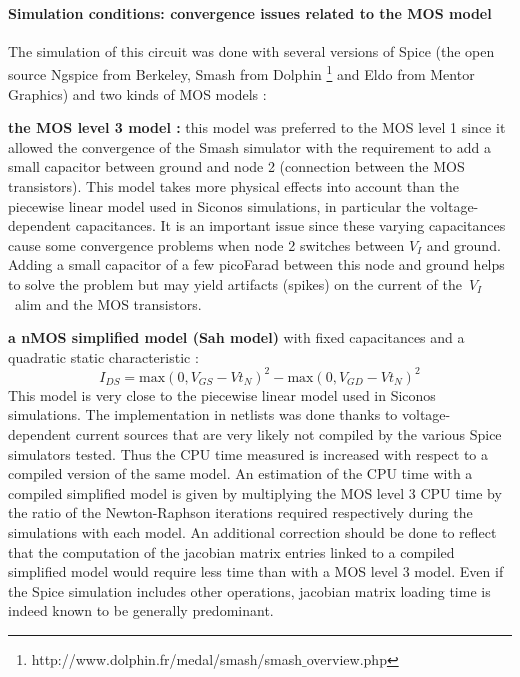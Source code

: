 \paragraph{Simulation conditions: convergence issues related to the MOS model}
The simulation of this circuit was done with several versions of {\sc Spice} (the open source {\sc Ngspice} from
Berkeley, {\sc Smash} from Dolphin \footnote{http://www.dolphin.fr/medal/smash/smash$\_$overview.php} and
{\sc Eldo} from Mentor Graphics) and two kinds of MOS models :
\begin{description}
\item \textbf{the MOS level 3 model :} this model was preferred to the MOS level 1 since it allowed the convergence
of the {\sc Smash} simulator with the requirement to add a small capacitor between ground and node 2 (connection between
the MOS transistors). This model takes more physical effects into account than the piecewise linear model used in {\sc Siconos} simulations,
in particular the voltage-dependent capacitances. It is an important issue since these varying capacitances
cause some convergence problems when node 2 switches between $V_I$ and ground.
Adding a small capacitor of a few picoFarad between this node and ground helps to solve the problem
but may yield artifacts (spikes) on the current of the~$V_I$~alim and the MOS transistors.
\item\textbf{a nMOS simplified model (Sah model)} with fixed capacitances and a quadratic static characteristic :
\[
I_{DS} = \textrm{max}(0,V_{GS}-Vt_N)^2 - \textrm{max}(0,V_{GD}-Vt_N)^2 
\]
This model is very close to the piecewise linear model used in {\sc Siconos} simulations. The implementation in netlists was done thanks to 
voltage-dependent current sources that are very likely not compiled by the various {\sc Spice} simulators tested.
Thus the CPU time measured is increased with respect to a compiled version of the same model.
An estimation of the CPU time with a compiled simplified model is given by multiplying the MOS level 3 CPU time
by the ratio of the Newton-Raphson iterations required respectively during the simulations with each model.
An additional correction should be done to reflect that the computation of the jacobian matrix entries
linked to a compiled simplified model would require less time than with a MOS level 3 model. Even if the {\sc Spice} simulation
includes other operations, jacobian matrix loading time is indeed known to be generally predominant.
\end{description}



